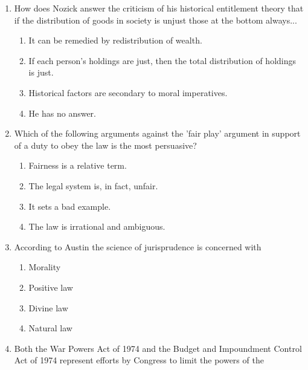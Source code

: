 \documentclass[12pt]{article}
\begin{document}
\begin{enumerate}[label=\arabic*.]
\begin{enumerate}[label=(\alph*)]
    \item Decreasing liberal bias in the news media
    \item Increasing visibility for individual candidates on TV
    \item Increasing concentration of ownership in the news media
    \item Decreasing cost of political ads on TV
\end{enumerate}
\item How does Nozick answer the criticism of his historical entitlement theory that if the distribution of goods in society is unjust those at the bottom always...
\begin{enumerate}[label=(\alph*)]
    \item It can be remedied by redistribution of wealth.
    \item If each person's holdings are just, then the total distribution of holdings is just.
    \item Historical factors are secondary to moral imperatives.
    \item He has no answer.
\end{enumerate}
\item Which of the following arguments against the 'fair play' argument in support of a duty to obey the law is the most persuasive?
\begin{enumerate}[label=(\alph*)]
    \item Fairness is a relative term.
    \item The legal system is, in fact, unfair.
    \item It sets a bad example.
    \item The law is irrational and ambiguous.
\end{enumerate}
\item According to Austin the science of jurisprudence is concerned with
\begin{enumerate}[label=(\alph*)]
    \item Morality
    \item Positive law
    \item Divine law
    \item Natural law
\end{enumerate}
\item Both the War Powers Act of 1974 and the Budget and Impoundment Control Act of 1974 represent efforts by Congress to limit the powers of the
\begin{enumerate}[label=(\alph*)]

\end{enumerate}
\end{enumerate}
\end{document}
